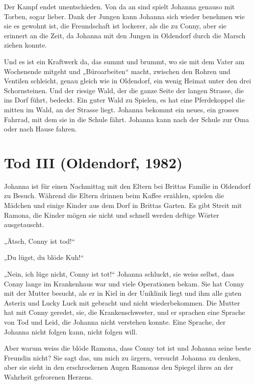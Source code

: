 \documentclass[10pt,a5paper]{book}
\begin{document}
Der Kampf endet unentschieden. Von da an sind spielt Johanna genauso mit Torben, sogar lieber. Dank der Jungen kann Johanna sich wieder benehmen wie sie es gewohnt ist, die Freundschaft ist lockerer, als die zu Conny, aber sie erinnert an die Zeit, da Johanna mit den Jungen in Oldendorf durch die Marsch ziehen konnte.

 Und es ist ein Kraftwerk da, das summt und brummt, wo sie mit dem Vater am Wochenende mitgeht und „Büroarbeiten“ macht, zwischen den Rohren und Ventilen schleicht, genau gleich wie in Oldendorf, ein wenig Heimat unter den drei Schornsteinen.  Und der riesige Wald, der die ganze Seite der langen Strasse, die ins Dorf führt, bedeckt. Ein guter Wald zu Spielen, es hat eine Pferdekoppel die mitten im Wald, an der Strasse liegt.
Johanna bekommt ein neues, ein grosses Fahrrad, mit dem sie in die Schule fährt. Johanna kann nach der Schule zur Oma oder nach Hause fahren. 



\section*{Tod III (Oldendorf, 1982)}




Johanna ist für einen Nachmittag mit den Eltern bei Brittas Familie in Oldendorf zu Besuch. Während die Eltern drinnen beim Kaffee erzählen, spielen die Mädchen und einige Kinder aus dem Dorf in Brittas Garten. Es gibt Streit mit Ramona, die Kinder mögen sie nicht und schnell werden  deftige Wörter ausgetauscht.  

„Ätsch, Conny ist tod!“

„Du lügst, du blöde Kuh!“

„Nein, ich lüge nicht, Conny ist tot!“ Johanna schluckt, sie weiss selbst, dass Conny lange im Krankenhaus war und viele Operationen bekam. Sie hat Conny mit der Mutter besucht, als er in Kiel in der Uniklinik liegt und ihm alle guten Asterix und Lucky Luck mit gebracht und  nicht wiederbekommen. Die Mutter hat mit Conny geredet, sie, die Krankenschwester, und er sprachen eine Sprache von Tod und Leid, die Johanna nicht verstehen konnte. Eine Sprache, der Johanna nicht folgen kann, nicht folgen will.

Aber warum weiss die blöde Ramona, dass Conny tot ist und Johanna seine beste Freundin nicht? Sie sagt das, um mich zu ärgern, versucht  Johanna zu denken, aber sie sieht in den erschrockenen Augen Ramonas den Spiegel ihres an der Wahrheit gefrorenen Herzens.
\end{document}
